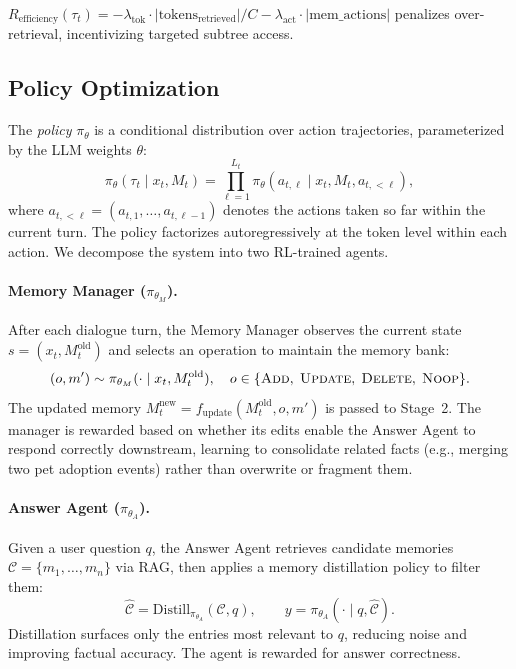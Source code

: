 \documentclass{article}
\theoremstyle{definition}
\begin{document}
$R_{\text{efficiency}}(\tau_t) = -\lambda_{\text{tok}} \cdot |\text{tokens}_{\text{retrieved}}| / C - \lambda_{\text{act}} \cdot |\text{mem\_actions}|$ penalizes over-retrieval, incentivizing targeted subtree access.



\subsection{Policy Optimization}

The \emph{policy} $\pi_\theta$ is a conditional distribution over action trajectories, parameterized by the LLM weights $\theta$:
\[
\pi_\theta(\tau_t \mid x_t, M_t) = \prod_{\ell=1}^{L_t} \pi_\theta(a_{t,\ell} \mid x_t, M_t, a_{t,<\ell}),
\]
where $a_{t,<\ell} = (a_{t,1}, \ldots, a_{t,\ell-1})$ denotes the actions taken so far within the current turn. The policy factorizes autoregressively at the token level within each action. We decompose the system into two RL-trained agents.

\paragraph{Memory Manager ($\pi_{\theta_M}$).}
After each dialogue turn, the Memory Manager observes the current state $s = (x_t, M_t^{\text{old}})$ and selects an operation to maintain the memory bank:
\[
(o, m') \sim \pi_{\theta_M}(\cdot \mid x_t, M_t^{\text{old}}), \quad o \in \{\textsc{Add},\; \textsc{Update},\; \textsc{Delete},\; \textsc{Noop}\}.
\]
The updated memory $M_t^{\text{new}} = f_{\text{update}}(M_t^{\text{old}}, o, m')$ is passed to Stage~2. The manager is rewarded based on whether its edits enable the Answer Agent to respond correctly downstream, learning to consolidate related facts (e.g., merging two pet adoption events) rather than overwrite or fragment them.

\paragraph{Answer Agent ($\pi_{\theta_A}$).}
Given a user question $q$, the Answer Agent retrieves candidate memories $\mathcal{C} = \{m_1, \ldots, m_n\}$ via RAG, then applies a memory distillation policy to filter them:
\[
\hat{\mathcal{C}} = \text{Distill}_{\pi_{\theta_A}}(\mathcal{C}, q), \qquad y = \pi_{\theta_A}(\cdot \mid q, \hat{\mathcal{C}}).
\]
Distillation surfaces only the entries most relevant to $q$, reducing noise and improving factual accuracy. The agent is rewarded for answer correctness.
\end{document}
